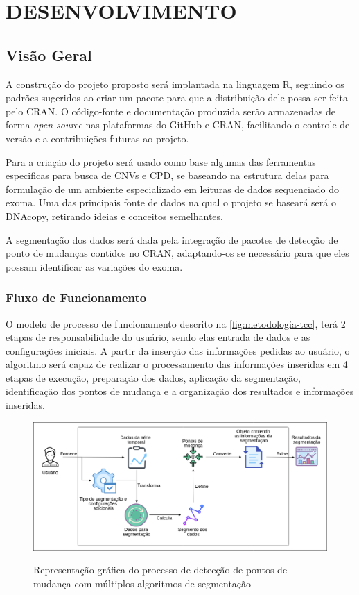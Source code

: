 \section{DESENVOLVIMENTO}

\subsection{Visão Geral}

A construção do projeto proposto será implantada na linguagem R, seguindo os padrões sugeridos ao criar um pacote para que a distribuição dele possa ser feita pelo CRAN. O código-fonte e documentação produzida serão armazenadas de forma \textit{open source} nas plataformas do GitHub e CRAN, facilitando o controle de versão e a contribuições futuras ao projeto.

Para a criação do projeto será usado como base algumas das ferramentas especificas para busca de CNVs e CPD, se baseando na estrutura delas para formulação de um ambiente especializado em leituras de dados sequenciado do exoma. Uma das principais fonte de dados na qual o projeto se baseará será o DNAcopy, retirando ideias e conceitos semelhantes.

A segmentação dos dados será dada pela integração de pacotes de detecção de ponto de mudanças contidos no CRAN, adaptando-os se necessário para que eles possam identificar as variações do exoma.

\subsubsection{Fluxo de Funcionamento}

O modelo de processo de funcionamento descrito na \autoref{fig:metodologia-tcc}, terá 2 etapas de responsabilidade do usuário, sendo elas entrada de dados e as configurações iniciais. A partir da inserção das informações pedidas ao usuário, o algoritmo será capaz de realizar o processamento das informações inseridas em 4 etapas de execução, preparação dos dados, aplicação da segmentação, identificação dos pontos de mudança e a organização dos resultados e informações inseridas.

\begin{figure}[!htb]
    \centering
    \caption{Representação gráfica do processo de detecção de pontos de mudança com múltiplos algoritmos de segmentação}
    \includegraphics[width=1\textwidth]{./dados/figuras/metodologia-tcc}
    \label{fig:metodologia-tcc}
\end{figure}

